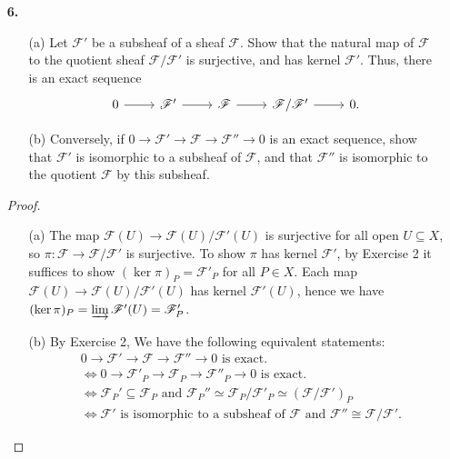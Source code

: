 \documentclass{article}
\newcommand{\fF}{\mathscr{F}}
\begin{document}
\begin{enumerate} [label=\textbf{\arabic*.}, leftmargin=0em]
\item[\textbf{6.}] \begin{itemize}
    \item[(a)] Let $\mathscr{F}'$ be a subsheaf of a sheaf $\mathscr{F}$. Show that the natural map of $\mathscr{F}$ to the quotient sheaf $\mathscr{F} / \mathscr{F}'$ is surjective, and has kernel $\mathscr{F}'$. Thus, there is an exact sequence
    \[ \begin{tikzcd}
        0 \arrow[r] & \mathscr{F}' \arrow[r] & \mathscr{F} \arrow[r] & \mathscr{F}/\mathscr{F}' \arrow[r] & 0.
        \end{tikzcd} \]
    \item[(b)] Conversely, if $0 \to \mathscr{F}' \to \mathscr{F} \to \mathscr{F}'' \to 0$ is an exact sequence, show that $\mathscr{F}'$ is isomorphic to a subsheaf of $\mathscr{F}$, and that $\mathscr{F}''$ is isomorphic to the quotient $\mathscr{F}$ by this subsheaf.
\end{itemize}

\begin{proof} $ $ \vspace{0pt}
    \begin{itemize} [leftmargin=0cm]
        \item[(a)] The map $\fF(U) \to \fF(U) / \fF'(U)$ is surjective for all open $U \subseteq X$, so $\pi : \fF \to \fF / \fF'$ is surjective. To show $\pi$ has kernel $\fF'$, by Exercise 2 it suffices to show $(\ker{\pi})_P = \fF'_P$ for all $P \in X$. Each map $\fF(U) \to \fF(U) / \fF'(U)$ has kernel $\fF'(U)$, hence we have $(\ker{\pi})_P = \varinjlim \fF'(U) = \fF'_P$.
        
        \item[(b)] By Exercise 2, We have the following equivalent statements:
        \begin{align*}
            & 0 \to \mathscr{F}' \to \mathscr{F} \to \mathscr{F}'' \to 0 \text{ is exact.} \\
            & \iff 0 \to \mathscr{F}'_P \to \mathscr{F}_P \to \mathscr{F}''_P \to 0 \text{ is exact.} \\
            & \iff \fF_P' \subseteq \fF_P \text{ and } \fF_P'' \simeq \fF_P / \fF'_P \simeq (\fF / \fF')_P \\
            & \iff \fF' \text{ is isomorphic to a subsheaf of $\fF$ and } \fF'' \cong \fF / \fF'.
        \end{align*}
    \end{itemize}
\end{proof}


\end{enumerate}
\end{document}
